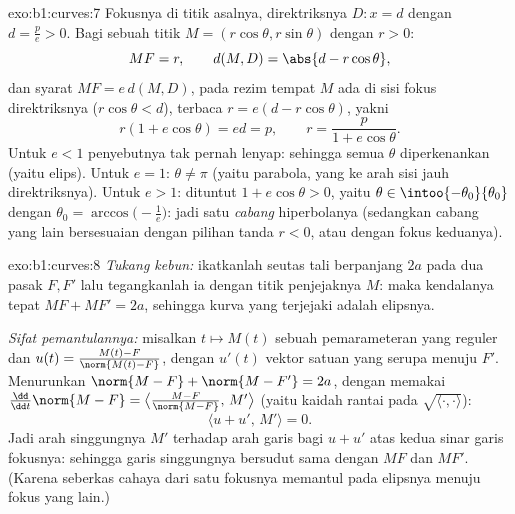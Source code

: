 \begin{solution}{exo:b1:curves:7}
Fokusnya di titik asalnya, direktriksnya $D: x = d$ dengan $d = \frac pe > 0$.
Bagi sebuah titik $M = (r\cos\theta, r\sin\theta)$ dengan $r > 0$:
\[
MF = r,
\qquad
d(M, D) = \abs{d - r\cos\theta},
\]
dan syarat  $MF = e\,d(M, D)$, pada rezim tempat $M$
ada di sisi fokus direktriksnya ($r\cos\theta < d$), terbaca $r
= e(d - r\cos\theta)$, yakni
\[
r(1 + e\cos\theta) = ed = p,
\qquad
r = \frac{p}{1 + e\cos\theta} .
\]
Untuk $e < 1$ penyebutnya tak pernah lenyap: sehingga semua $\theta$ diperkenankan
(yaitu elips). Untuk $e = 1$: $\theta \neq \pi$ (yaitu parabola, yang  ke arah
sisi jauh direktriksnya). Untuk $e > 1$: dituntut $1 + e\cos\theta > 0$,
yaitu $\theta \in \intoo{-\theta_0}{\theta_0}$ dengan $\theta_0 =
\arccos\bigl(-\frac1e\bigr)$: jadi satu \emph{cabang} hiperbolanya
(sedangkan cabang yang lain bersesuaian dengan pilihan tanda $r < 0$, atau dengan
fokus keduanya).
\end{solution}

\begin{solution}{exo:b1:curves:8}
\emph{Tukang kebun:} ikatkanlah seutas tali berpanjang $2a$ pada dua pasak $F,
F'$ lalu tegangkanlah ia dengan titik penjejaknya $M$: maka kendalanya tepat
$MF + MF' = 2a$, sehingga kurva yang terjejaki adalah elipsnya.

\emph{Sifat pemantulannya:} misalkan $t \mapsto M(t)$ sebuah pemarameteran
yang reguler dan $u(t) = \frac{M(t) - F}{\norm{M(t) - F}}$,
dengan $u'(t)$ vektor satuan yang serupa menuju $F'$. Menurunkan
$\norm{M - F} + \norm{M - F'} = 2a$, dengan memakai $\frac{\dd}{\dd
t}\norm{M - F} = \bigl\langle \frac{M - F}{\norm{M-F}},\,
M'\bigr\rangle$ (yaitu kaidah rantai pada $\sqrt{\langle\cdot,\cdot\rangle}$):
\[
\bigl\langle u + u',\, M'\bigr\rangle = 0 .
\]
Jadi arah singgungnya $M'$  terhadap arah garis bagi
$u + u'$ atas kedua sinar garis fokusnya: sehingga garis singgungnya bersudut sama
dengan $MF$ dan $MF'$. (Karena seberkas cahaya dari satu fokusnya memantul
pada elipsnya menuju fokus yang lain.)
\end{solution}

